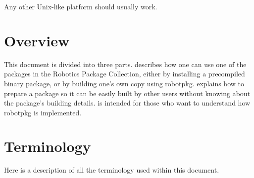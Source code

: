 Any  other  Unix-like platform  should  usually  work.

\section{Overview} %

This document is divided  into three parts.  
describes how  one  can  use  one of   the  packages  in the  Robotics  Package
Collection, either  by installing a precompiled binary  package, or by building
one's own  copy  using  robotpkg.   
explains how  to prepare a package so  it can be  easily  built by  other users
without     knowing     about     the     package's    building        details.
 is  intended for  those   who want to
understand how robotpkg is implemented.


\section{Terminology} %

Here is a description of all the terminology used within this document.

